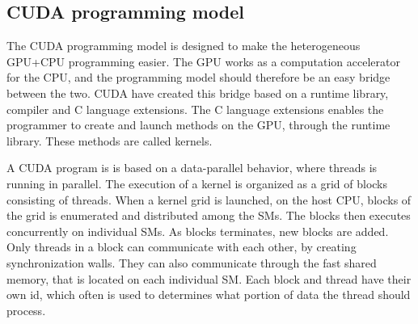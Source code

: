 


\subsection{CUDA programming model} %
\label{ssub:cuda_programming_model}

The CUDA programming model is designed to make the heterogeneous GPU+CPU programming easier. The GPU works as a computation accelerator for the CPU, and the programming model should therefore be an easy bridge between the two. CUDA have created this bridge based on a runtime library, compiler and C language extensions. The C language extensions enables the programmer to create and launch methods on the GPU, through the runtime library. These methods are called kernels.

A CUDA program is is based on a data-parallel behavior, where threads is running in parallel. The execution of a kernel is organized as a grid of blocks consisting of threads. When a kernel grid is launched, on the host CPU, blocks of the grid is enumerated and distributed among the SMs. The blocks then executes concurrently on individual SMs. As blocks terminates, new blocks are added. Only threads in a block can communicate with each other, by creating synchronization walls. They can also communicate through the fast shared memory, that is located on each individual SM\@. Each block and thread have their own id, which often is used to determines what portion of data the thread should process.


\cleardoublepage
